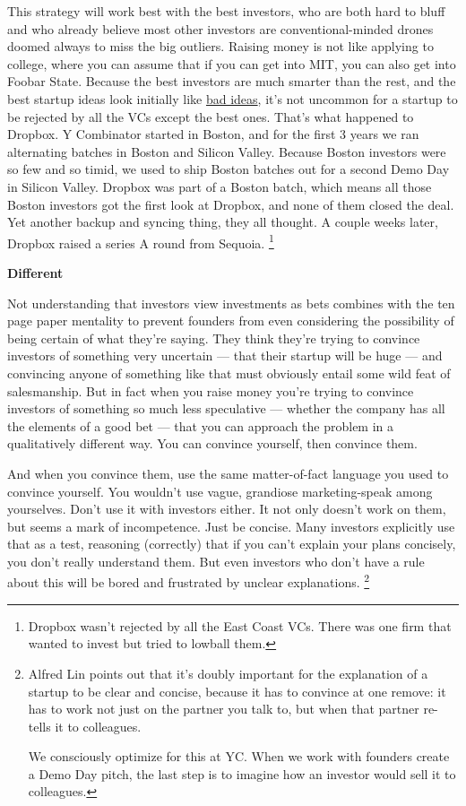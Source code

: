 \documentclass[12pt]{book}
\begin{document}
This strategy will work best with the best investors, who are both hard
to bluff and who already believe most other investors are
conventional-minded drones doomed always to miss the big outliers.
Raising money is not like applying to college, where you can assume that
if you can get into MIT, you can also get into Foobar State. Because the
best investors are much smarter than the rest, and the best startup
ideas look initially like \href{startupideas.html}{bad ideas}, it's not
uncommon for a startup to be rejected by all the VCs except the best
ones. That's what happened to Dropbox. Y Combinator started in Boston,
and for the first 3 years we ran alternating batches in Boston and
Silicon Valley. Because Boston investors were so few and so timid, we
used to ship Boston batches out for a second Demo Day in Silicon Valley.
Dropbox was part of a Boston batch, which means all those Boston
investors got the first look at Dropbox, and none of them closed the
deal. Yet another backup and syncing thing, they all thought. A couple
weeks later, Dropbox raised a series A round from Sequoia.
\footnote{Dropbox wasn't rejected by all the East Coast VCs. There was
one firm that wanted to invest but tried to lowball them.}

\textbf{Different}

Not understanding that investors view investments as bets combines with
the ten page paper mentality to prevent founders from even considering
the possibility of being certain of what they're saying. They think
they're trying to convince investors of something very uncertain ---
that their startup will be huge --- and convincing anyone of something
like that must obviously entail some wild feat of salesmanship. But in
fact when you raise money you're trying to convince investors of
something so much less speculative --- whether the company has all the
elements of a good bet --- that you can approach the problem in a
qualitatively different way. You can convince yourself, then convince
them.

And when you convince them, use the same matter-of-fact language you
used to convince yourself. You wouldn't use vague, grandiose
marketing-speak among yourselves. Don't use it with investors either. It
not only doesn't work on them, but seems a mark of incompetence. Just be
concise. Many investors explicitly use that as a test, reasoning
(correctly) that if you can't explain your plans concisely, you don't
really understand them. But even investors who don't have a rule about
this will be bored and frustrated by unclear explanations.
\footnote{Alfred Lin points out that it's doubly important for the
explanation of a startup to be clear and concise, because it has to
convince at one remove: it has to work not just on the partner you talk
to, but when that partner re-tells it to colleagues.

We consciously optimize for this at YC. When we work with founders
create a Demo Day pitch, the last step is to imagine how an investor
would sell it to colleagues.}
\end{document}
